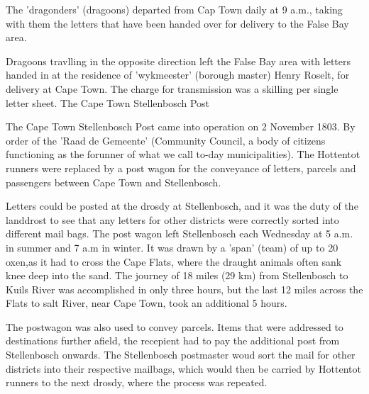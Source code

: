 The 'dragonders' (dragoons) departed from Cap Town daily at 9 a.m., taking with them the letters that have been handed over for delivery to the False Bay area.

Dragoons travlling in the opposite direction left the False Bay area with letters handed in at the residence of 'wykmeester' (borough master) Henry Roselt, for delivery at Cape Town. The charge for transmission was a skilling per single letter sheet.
The Cape Town Stellenbosch Post

The Cape Town Stellenbosch Post came into operation on 2 November 1803. By order of the 'Raad de Gemeente' (Community Council, a body of citizens functioning as the forunner of what we call to-day municipalities). The Hottentot runners were replaced by a post wagon for the conveyance of letters, parcels and passengers between Cape Town and Stellenbosch.

Letters could be posted at the drosdy at Stellenbosch, and it was the duty of the landdrost to see that any letters for other districts were correctly sorted into different mail bags. The post wagon left Stellenbosch each Wednesday at 5 a.m. in summer and 7 a.m in winter. It was drawn by a 'span' (team) of up to 20 oxen,as it had to cross the Cape Flats, where the draught animals often sank knee deep into the sand. The journey of 18 miles (29 km) from Stellenbosch to Kuils River was accomplished in only three hours, but the last 12 miles across the Flats to salt River, near Cape Town, took an additional 5 hours.

The postwagon was also used to convey parcels. Items that were addressed to destinations further afield, the recepient had to pay the additional post from Stellenbosch onwards. The Stellenbosch postmaster woud sort the mail for other districts into their respective mailbags, which would then be carried by Hottentot runners to the next drosdy, where the process was repeated.

 

 
	 
                                         